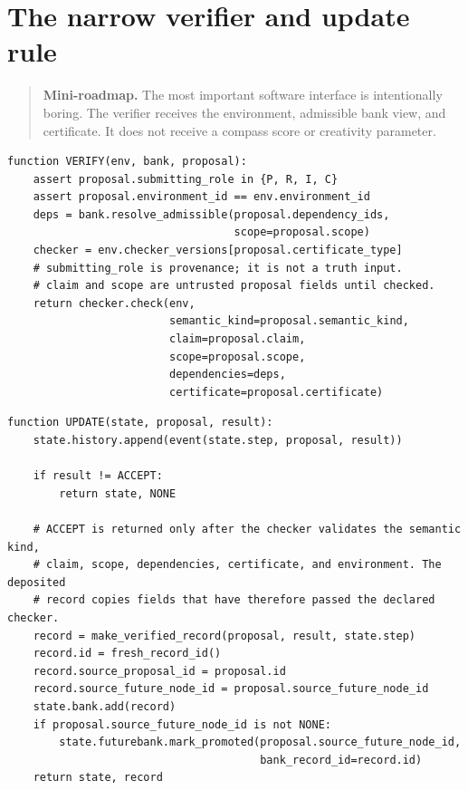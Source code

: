 \documentclass[11pt,openany]{book}
\theoremstyle{definition}
\theoremstyle{remark}
\newenvironment{miniroadmap}{\begin{quote}\small\color{deepblue}\textbf{Mini-roadmap.} }{\end{quote}}
\begin{document}
\chapter{The narrow verifier and update rule}
\begin{miniroadmap}
The most important software interface is intentionally boring. The verifier receives the environment, admissible bank view, and certificate. It does not receive a compass score or creativity parameter.
\end{miniroadmap}

\begin{lstlisting}[style=pseudo,caption={Narrow verification interface}]
function VERIFY(env, bank, proposal):
    assert proposal.submitting_role in {P, R, I, C}
    assert proposal.environment_id == env.environment_id
    deps = bank.resolve_admissible(proposal.dependency_ids,
                                   scope=proposal.scope)
    checker = env.checker_versions[proposal.certificate_type]
    # submitting_role is provenance; it is not a truth input.
    # claim and scope are untrusted proposal fields until checked.
    return checker.check(env,
                         semantic_kind=proposal.semantic_kind,
                         claim=proposal.claim,
                         scope=proposal.scope,
                         dependencies=deps,
                         certificate=proposal.certificate)
\end{lstlisting}

\begin{lstlisting}[style=pseudo,caption={Verifier-gated update}]
function UPDATE(state, proposal, result):
    state.history.append(event(state.step, proposal, result))

    if result != ACCEPT:
        return state, NONE

    # ACCEPT is returned only after the checker validates the semantic kind,
    # claim, scope, dependencies, certificate, and environment. The deposited
    # record copies fields that have therefore passed the declared checker.
    record = make_verified_record(proposal, result, state.step)
    record.id = fresh_record_id()
    record.source_proposal_id = proposal.id
    record.source_future_node_id = proposal.source_future_node_id
    state.bank.add(record)
    if proposal.source_future_node_id is not NONE:
        state.futurebank.mark_promoted(proposal.source_future_node_id,
                                       bank_record_id=record.id)
    return state, record
\end{lstlisting}
\end{document}
